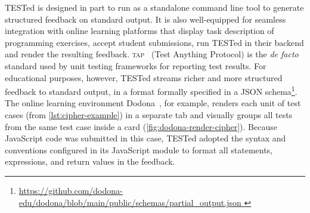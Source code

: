 \documentclass[../main]{subfiles}
\begin{document}
TESTed is designed in part to run as a standalone command line tool to generate structured feedback on standard output.
It is also well-equipped for seamless integration with online learning platforms that display task description of programming exercises, accept student submissions, run TESTed in their backend and render the resulting feedback.
\textsc{tap}~\autocite{schlueterTAP14TestAnything2022} (Test Anything Protocol) is the \textit{de facto} standard used by unit testing frameworks for reporting test results.
For educational purposes, however, TESTed streams richer and more structured feedback to standard output, in a format formally specified in a JSON schema\footnote{\url{ https://github.com/dodona-edu/dodona/blob/main/public/schemas/partial_output.json
}}.
The online learning environment Dodona~\autocite{vanpetegemDodonaLearnCode2023}, for example, renders each unit of test cases (from \vref{lst:cipher-example}) in a separate tab and visually groups all tests from the same test case inside a card (\vref{fig:dodona-render-cipher}).
Because JavaScript code was submitted in this case, TESTed adopted the syntax and conventions configured in its JavaScript module to format all statements, expressions, and return values in the feedback.
\end{document}
